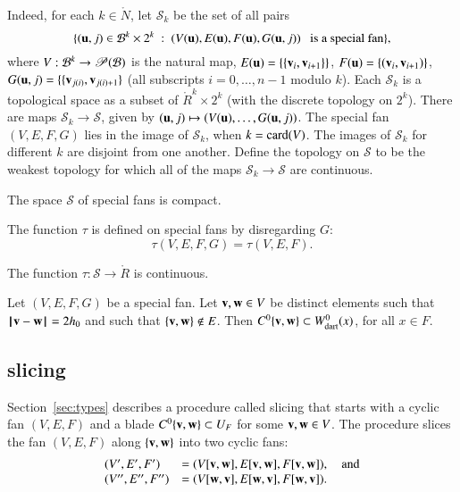 Indeed, for each $k\in\ring{N}$,  let ${\mathcal S}_k$ be the set of all pairs 
$$\{({\mathbf u},j) \in{\mathcal B}^k\times 2^k \ :\  (V({\mathbf u}),E({\mathbf u}),F({\mathbf u}),G({\mathbf u},j)) \text{~~ is a special fan}\},$$
where $V:{\mathcal B}^k\to {\mathscr P}({\mathcal B})$ is the natural map, $E({\mathbf u}) = \{\{{\mathbf v}_i,{\mathbf v}_{i+1}\}\}$,
$F({\mathbf u}) = \{({\mathbf v}_i,{\mathbf v}_{i+1})\}$, $G({\mathbf u},j) = \{\{{\mathbf v}_{j(i)},{\mathbf v}_{j(i)+1}\}$ (all subscripts $i=0,\ldots,n-1$ modulo $k$).  Each ${\mathcal S}_k$ is
a topological space as a subset of $\ring{R}^k\times 2^k$ (with the discrete topology on $2^k$).  There are maps ${\mathcal S}_k\to{\mathcal S}$, given by
$({\mathbf u},j)\mapsto (V({\mathbf u}),\ldots,G({\mathbf u},j))$.
The special fan $(V,E,F,G)$ lies in the image of ${\mathcal S}_k$, when
$k = {\operatorname{card}}(V)$.  The images of ${\mathcal S}_k$ for different $k$ are disjoint
from one another.  Define the topology on ${\mathcal S}$ to be the weakest topology for which all of the maps ${\mathcal S}_k\to {\mathcal S}$ are
continuous.


\begin{lemma}
The space ${\mathcal S}$ of special fans is compact.
\end{lemma}

The function $\tau$ is defined on special fans by disregarding $G$:
$$
\tau(V,E,F,G) = \tau(V,E,F).
$$

\begin{lemma}
The function $\tau:{\mathcal S}\to \ring{R}$ is continuous.
\end{lemma}

\begin{lemma}\label{lemma:2hm-slice}
Let $(V,E,F,G)$ be a special fan.  Let ${\mathbf v},{\mathbf w}\in V$ be distinct elements such that ${\hskip0.1em|\hskip-0.15em|\hskip0.1em}{\mathbf v} - {\mathbf w}{\hskip0.1em|\hskip-0.15em|\hskip0.1em}=2{h_0}$ and such that $\{{\mathbf v},{\mathbf w}\}\not\in E$.
Then $C^0\{{\mathbf v},{\mathbf w}\}\subset W^0_{\text{dart}}(x)$, for all $x\in F$.
\end{lemma}


\subsection{slicing}


Section~\ref{sec:types} describes a procedure called slicing that starts with a cyclic fan $(V,E,F)$
and a blade $C^0\{{\mathbf v},{\mathbf w}\} \subset U_F$ for some ${\mathbf v},{\mathbf w}\in V$.  The procedure slices the fan $(V,E,F)$ along $\{{\mathbf v},{\mathbf w}\}$  into two cyclic fans:
$$
\begin{array}{lll}
(V',E',F')&=(V[{\mathbf v},{\mathbf w}],E[{\mathbf v},{\mathbf w}],F[{\mathbf v},{\mathbf w}]),\quad\text{and}\\
 (V'',E'',F'')&= (V[{\mathbf w},{\mathbf v}],E[{\mathbf w},{\mathbf v}],F[{\mathbf w},{\mathbf v}]).
\end{array}
$$


